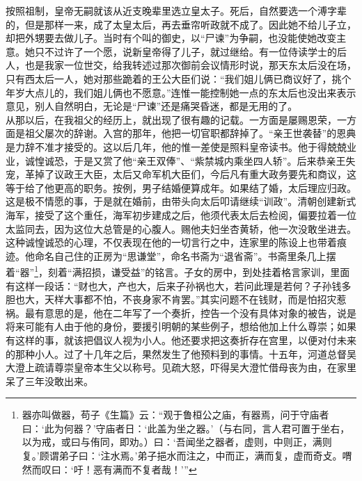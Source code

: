   按照祖制，皇帝无嗣就该从近支晚辈里选立皇太子。死后，自然要选一个溥字辈的，但是那样一来，成了太皇太后，再去垂帘听政就不成了。因此她不给儿子立，却把外甥要去做儿子。当时有个叫的御史，以“尸谏”为争嗣，也没能使她改变主意。她只不过许了一个愿，说新皇帝得了儿子，就过继给。有一位侍读学士的后人，也是我家一位世交，给我转述过那次御前会议情形时说，那天东太后没在场，只有西太后一人，她对那些跪着的王公大臣们说：“我们姐儿俩已商议好了，挑个年岁大点儿的，我们姐儿俩也不愿意。”连惟一能控制她一点的东太后也没出来表示意见，别人自然明白，无论是“尸谏”还是痛哭昏迷，都是无用的了。\\

  从那以后，在我祖父的经历上，就出现了很有趣的记载。一方面是屡赐恩荣，一方面是祖父屡次的辞谢。入宫的那年，他把一切官职都辞掉了。“亲王世袭替”的恩典是力辞不准才接受的。这以后几年，他的惟一差使是照料皇帝读书。他于得兢兢业业，诚惶诚恐，于是又赏了他“亲王双俸”、“紫禁城内乘坐四人轿”。后来恭亲王失宠，革掉了议政王大臣，太后又命军机大臣们，今后凡有重大政务要先和商议，这等于给了他更高的职务。按例，男子结婚便算成年。如果结了婚，太后理应归政。这是极不情愿的事，于是就在婚前，由带头向太后叩请继续“训政”。清朝创建新式海军，接受了这个重任，海军初步建成之后，他须代表太后去检阅，偏要拉着一位太监同去，因为这位大总管是的心腹人。赐他夫妇坐杏黄轿，他一次没敢坐进去。这种诚惶诚恐的心理，不仅表现在他的一切言行之中，连家里的陈设上也带着痕迹。他命名自己住的正房为“思谦堂”，命名书斋为“退省斋”。书斋里条几上摆着“器”\footnote{器亦叫做器，苟子《生篇》云：“观于鲁桓公之庙，有器焉，问于守庙者曰：‘此为何器？’守庙者日：‘此盖为坐之器。’（与右同，言人君可置于坐右，以为戒，或曰与侑同，即劝。）曰：‘吾闻坐之器者，虚则，中则正，满则复。’顾谓弟子曰：‘注水焉。’弟子挹水而注之，中而正，满而复，虚而奇攴。喟然而叹曰：‘吁！恶有满而不复者哉！’”}，刻着“满招损，谦受益”的铭言。子女的房中，到处挂着格言家训，里面有这样一段话：“财也大，产也大，后来子孙祸也大，若问此理是若何？子孙钱多胆也大，天样大事都不怕，不丧身家不肯罢。”其实问题不在钱财，而是怕招灾惹祸。最有意思的是，他在二年写了一个奏折，控告一个没有具体对象的被告，说是将来可能有人由于他的身份，要援引明朝的某些例子，想给他加上什么尊崇；如果有这样的事，就该把倡议人视为小人。他还要求把这奏折存在宫里，以便对付未来的那种小人。过了十几年之后，果然发生了他预料到的事情。十五年，河道总督吴大澄上疏请尊崇皇帝本生父以称号。见疏大怒，吓得吴大澄忙借母丧为由，在家里呆了三年没敢出来。\\

